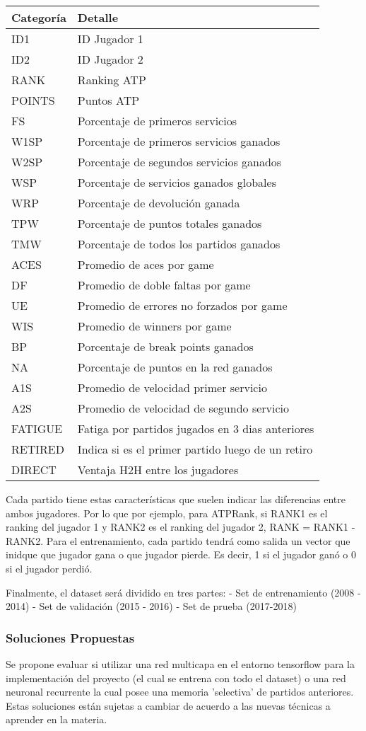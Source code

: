\documentclass[11pt]{article}
\begin{document}
\begin{longtable}[]{@{}ll@{}}
\toprule
Categoría & Detalle\tabularnewline
\midrule
\endhead
ID1 & ID Jugador 1\tabularnewline
ID2 & ID Jugador 2\tabularnewline
RANK & Ranking ATP\tabularnewline
POINTS & Puntos ATP\tabularnewline
FS & Porcentaje de primeros servicios\tabularnewline
W1SP & Porcentaje de primeros servicios ganados\tabularnewline
W2SP & Porcentaje de segundos servicios ganados\tabularnewline
WSP & Porcentaje de servicios ganados globales\tabularnewline
WRP & Porcentaje de devolución ganada\tabularnewline
TPW & Porcentaje de puntos totales ganados\tabularnewline
TMW & Porcentaje de todos los partidos ganados\tabularnewline
ACES & Promedio de aces por game\tabularnewline
DF & Promedio de doble faltas por game\tabularnewline
UE & Promedio de errores no forzados por game\tabularnewline
WIS & Promedio de winners por game\tabularnewline
BP & Porcentaje de break points ganados\tabularnewline
NA & Porcentaje de puntos en la red ganados\tabularnewline
A1S & Promedio de velocidad primer servicio\tabularnewline
A2S & Promedio de velocidad de segundo servicio\tabularnewline
FATIGUE & Fatiga por partidos jugados en 3 dias
anteriores\tabularnewline
RETIRED & Indica si es el primer partido luego de un
retiro\tabularnewline
DIRECT & Ventaja H2H entre los jugadores\tabularnewline
\bottomrule
\end{longtable}

Cada partido tiene estas características que suelen indicar las
diferencias entre ambos jugadores. Por lo que por ejemplo, para ATPRank,
si RANK1 es el ranking del jugador 1 y RANK2 es el ranking del jugador
2, RANK = RANK1 - RANK2. Para el entrenamiento, cada partido tendrá como
salida un vector que inidque que jugador gana o que jugador pierde. Es
decir, 1 si el jugador ganó o 0 si el jugador perdió.

Finalmente, el dataset será dividido en tres partes: - Set de
entrenamiento (2008 - 2014) - Set de validación (2015 - 2016) - Set de
prueba (2017-2018)

    \subsubsection{Soluciones Propuestas}\label{soluciones-propuestas}

Se propone evaluar si utilizar una red multicapa en el entorno
tensorflow para la implementación del proyecto (el cual se entrena con
todo el dataset) o una red neuronal recurrente la cual posee una memoria
'selectiva' de partidos anteriores. Estas soluciones están sujetas a
cambiar de acuerdo a las nuevas técnicas a aprender en la materia.
\end{document}
